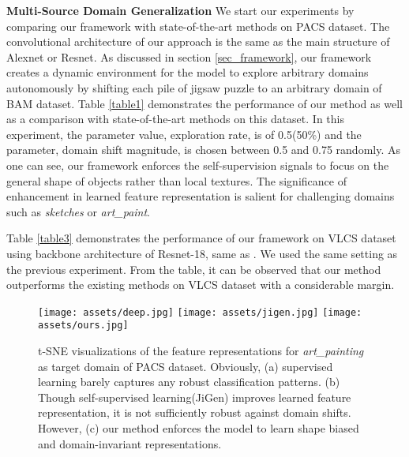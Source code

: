 \documentclass[10pt,twocolumn,letterpaper]{article}
\begin{document}
\vspace{2mm}
\noindent
\textbf{Multi-Source Domain Generalization}\quad
We start our experiments by comparing our framework with state-of-the-art methods on PACS dataset\cite{li2017deeper}. 
The convolutional architecture of our approach is the same as the main structure of Alexnet or Resnet.
As discussed in section \ref{sec_framework}, our framework creates a dynamic environment for the model to explore arbitrary domains autonomously by shifting each pile of jigsaw puzzle to an arbitrary domain of BAM dataset. Table \ref{table1} demonstrates the performance of our method as well as a comparison with state-of-the-art methods on this dataset.
In this experiment, the  parameter value, exploration rate, is of 0.5(50\%) and the  parameter, domain shift magnitude, is chosen between 0.5 and 0.75 randomly.
As one can see, our framework enforces the self-supervision signals to focus on the general shape of objects rather than local textures.
The significance of enhancement in learned feature representation is salient for challenging domains such as \textit{sketches} or \textit{art\_paint}.

Table \ref{table3} demonstrates the performance of our framework on VLCS\cite{torralba2011unbiased} dataset using backbone architecture of Resnet-18, same as \cite{carlucci2019domain}. We used the same setting as the previous experiment. From the table, it can be observed that our method outperforms the existing methods on VLCS \cite{torralba2011unbiased} dataset with a considerable margin.

\begin{figure*}[t!]
	\begin{center}
		\texttt{[image: assets/deep.jpg]}
		\hspace{3mm}
		\texttt{[image: assets/jigen.jpg]}
		\hspace{3mm}
		\texttt{[image: assets/ours.jpg]}
	\end{center}
	\caption{t-SNE visualizations of the feature representations for \textit{art\_painting} as target domain of PACS dataset. Obviously, (a) supervised learning barely captures any robust classification patterns. (b) Though self-supervised learning(JiGen\cite{carlucci2019domain}) improves learned feature representation, it is not sufficiently robust against domain shifts. However, (c) our method enforces the model to learn shape biased and domain-invariant representations.}
	\label{figure4}
\end{figure*}
\end{document}
